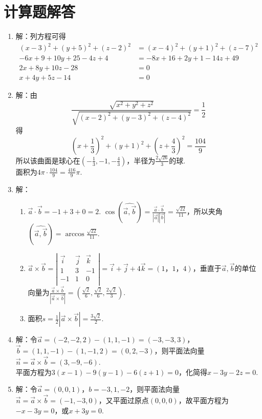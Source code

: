 \section{计算题解答}
\begin{enumerate}
	\item 解：列方程可得\[ \begin{split}
(x-3)^2+(y+5)^2+(z-2)^2 &= (x-4)^2+(y+1)^2+(z-7)^2 \\
-6x+9+10y+25-4z+4 &= -8x+16+2y+1-14z+49 \\
2x+8y+10z-28 & = 0 \\
x+4y+5z-14 & = 0
\end{split} \]
	\item 解：由$$
\frac{\sqrt{x^2+y^2+z^2}}{\sqrt{(x-2)^2+(y-3)^2+(z-4)^2}}=\frac{1}{2}
$$得$$
(x+\frac{1}{3})^2+(y+1)^2+(z+\frac{4}{3})^2 = \frac{104}{9}
$$
所以该曲面是球心在$ (-\frac{1}{3},-1,-\frac{4}{3}) $，半径为$ \frac{2\sqrt{26}}{3} $的球.\\
面积为$ 4\pi\cdot\frac{104}{9}=\frac{416}{9}\pi $.
	\item 解：
		\begin{enumerate}[(1)]
			\item $ \vec{a}\cdot\vec{b}=-1+3+0=2 $. $ \cos(\widehat{\vec{a},\vec{b}})=\frac{\vec{a}\cdot\vec{b}}{|\vec{a}||\vec{b}|}=\frac{\sqrt{22}}{11} $，所以夹角$ (\widehat{\vec{a},\vec{b}})=\arccos\frac{\sqrt{22}}{11} $.
			\item $ \vec{a}\times\vec{b}=\left| \begin{matrix}
	\vec{i}&		\vec{j}&		\vec{k}\\
													1&		3&		-1\\
													-1&		1&		0\\
												\end{matrix} \right| = \vec{i}+\vec{j}+4\vec{k}=(1，1，4) $，垂直于$ \vec{a},\vec{b} $的单位向量为$ \frac{\vec{a}\times\vec{b}}{|\vec{a}\times\vec{b}|}=(\frac{\sqrt{2}}{6},\frac{\sqrt{2}}{6},\frac{2\sqrt{2}}{3}) $.
			\item 面积$ s=\frac{1}{2}|\vec{a}\times\vec{b}|=\frac{3\sqrt{2}}{2} $.
		\end{enumerate}
	\item 解：令$ \vec{a}=(-2,-2,2)-(1,1,-1)=(-3,-3,3) $，$ \vec{b}=(1,1,-1)-(1,-1,2)=(0,2,-3) $，则平面法向量$ \vec{n}=\vec{a}\times\vec{b}=(3,-9,-6) $.\\
平面方程为$ 3(x-1)-9(y-1)-6(z+1)=0 $，化简得$ x-3y-2z=0 $.
	\item 解：令$ \vec{a}=(0,0,1) $，$ b=-3,1,-2 $，则平面法向量$ \vec{n}=\vec{a}\times\vec{b}=(-1,-3,0) $，又平面过原点$ (0,0,0) $，故平面方程为$ -x-3y=0 $，或$ x+3y=0 $.

\end{enumerate}
